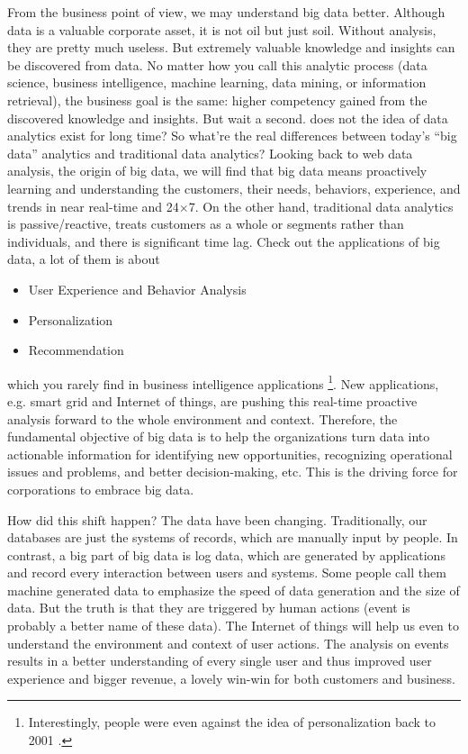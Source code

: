 \documentclass[11pt]{book}
\begin{document}
From the business point of view, we may understand big data better. Although data is a valuable corporate asset, it is not oil but just soil. Without analysis, they are pretty much useless. But extremely valuable knowledge and insights can be discovered from data. No matter how you call this analytic process (data science, business intelligence, machine learning, data mining, or information retrieval), the business goal is the same: higher competency gained from the discovered knowledge and insights. But wait a second. does not the idea of data analytics exist for long time? So what're the real differences between today's ``big data'' analytics and traditional data analytics? Looking back to web data analysis, the origin of big data, we will find that big data means proactively learning and understanding the customers, their needs, behaviors, experience, and trends in near real-time and 24$\times$7. On the other hand, traditional data analytics is passive/reactive, treats customers as a whole or segments rather than individuals, and there is significant time lag. Check out the applications of big data, a lot of them is about
\begin{itemize}
\item User Experience and Behavior Analysis
\item Personalization
\item Recommendation
\end{itemize}
which you rarely find in business intelligence applications \footnote{Interestingly, people were even against the idea of personalization back to 2001 \cite{NunesKambil2001}.}. New applications, e.g. smart grid and Internet of things, are pushing this real-time proactive analysis forward to the whole environment and context. Therefore, the fundamental objective of big data is to help the organizations turn data into actionable information for identifying new opportunities, recognizing operational issues and problems, and better decision-making, etc. This is the driving force for corporations to embrace big data.

How did this shift happen? The data have been changing. Traditionally, our databases are just the systems of records, which are manually input by people. In contrast, a big part of big data is log data, which are generated by applications and record every interaction between users and systems. Some people call them machine generated data to emphasize the speed of data generation and the size of data. But the truth is that they are triggered by human actions (event is probably a better name of these data). The Internet of things will help us even to understand the environment and context of user actions. The analysis on events results in a better understanding of every single user and thus improved user experience and bigger revenue, a lovely win-win for both customers and business.
\end{document}
